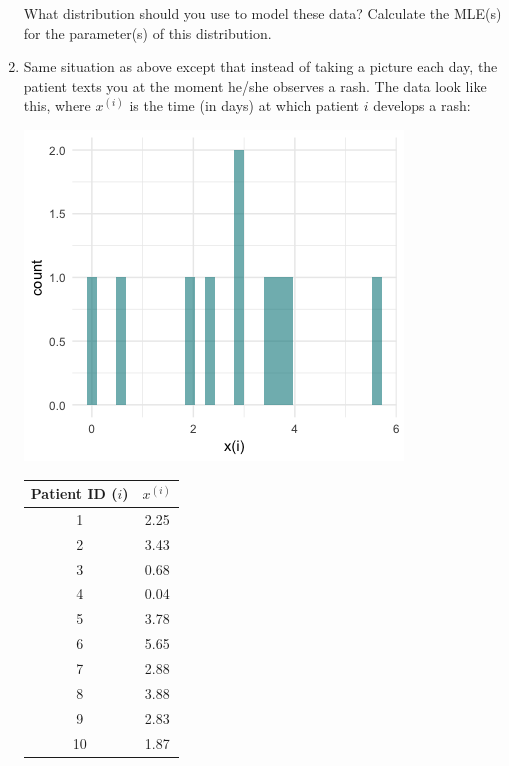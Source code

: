 \begin{enumerate}
What distribution should you use to model these data? Calculate the MLE(s) for the parameter(s) of this distribution.
\vspace{3mm}

\item Same situation as above except that instead of taking a picture each day, the patient texts you at the moment he/she observes a rash. The data look like this, where $x^{(i)}$ is the time (in days) at which patient $i$ develops a rash: 

\begin{minipage}[c]{0.5\textwidth}
\begin{center}
\includegraphics[width=\textwidth]{img/l01-problem3.png}
\end{center}
\end{minipage}
\begin{minipage}[c]{0.5\textwidth}
\begin{center}{\small
\begin{tabular}{cc}
\toprule
Patient ID ($i$) & $x^{(i)}$ \\
\midrule
1 & 2.25 \\
2 & 3.43\\
3 & 0.68\\
4 & 0.04\\
5 & 3.78\\
6 & 5.65\\
7 & 2.88\\
8 & 3.88\\
9 & 2.83\\
10 & 1.87\\
\end{tabular}}
\end{center}
\end{minipage}
\vspace{3mm}


\end{enumerate}
